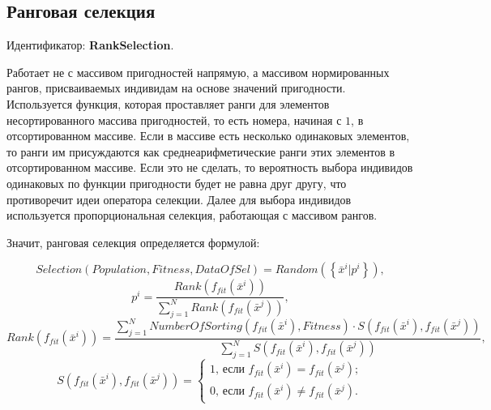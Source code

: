 \subsection{Ранговая селекция}\label{SetOfOperatorsAlgorithms:RankSelection}

Идентификатор: \textbf{RankSelection}.

Работает не  с массивом пригодностей напрямую, а массивом нормированных рангов, присваиваемых индивидам на основе значений пригодности. Используется функция, которая проставляет ранги для элементов несортированного массива пригодностей, то есть номера, начиная с $ 1 $, в отсортированном массиве. Если в массиве есть несколько одинаковых элементов, то ранги им присуждаются как среднеарифметические ранги этих элементов в отсортированном массиве. Если это не сделать, то вероятность выбора индивидов одинаковых по функции пригодности будет не равна друг другу, что противоречит идеи оператора селекции. Далее для выбора индивидов используется пропорциональная селекция, работающая с массивом рангов.

Значит, ранговая селекция определяется формулой:

\begin{equation}
\label{SetOfOperatorsAlgorithms:eq:RankSelection}
Selection\left( Population, Fitness, DataOfSel\right) = Random\left( \left\lbrace\bar{x}^i | p^i \right\rbrace \right),
\end{equation}
\begin{equation}
p^i=\dfrac{Rank\left( f_{fit}\left( \bar{x}^i\right)\right)  }{\sum_{j=1}^N{Rank\left( f_{fit}\left( \bar{x}^j\right)\right)}},
\end{equation}
\begin{equation}\label{SetOfOperatorsAlgorithms:eq:Rank}
Rank\left( f_{fit}\left( \bar{x}^i\right)\right)=\dfrac{\sum_{j=1}^{N}{NumberOfSorting\left( f_{fit}\left( \bar{x}^i\right), Fitness\right)  \cdot S\left(  f_{fit}\left( \bar{x}^i\right),  f_{fit}\left( \bar{x}^j\right)\right) }}{\sum_{j=1}^{N}{S\left(  f_{fit}\left( \bar{x}^i\right),  f_{fit}\left( \bar{x}^j\right)\right) }},
\end{equation}
\begin{equation}
S\left(  f_{fit}\left( \bar{x}^i\right),  f_{fit}\left( \bar{x}^j\right)\right)= \left\lbrace \begin{array}{l}
1 \text{, если } f_{fit}\left( \bar{x}^i\right)=  f_{fit}\left( \bar{x}^j\right);\\ 0\text{, если } f_{fit}\left( \bar{x}^i\right)\neq  f_{fit}\left( \bar{x}^j\right).
\end{array}\right.
\end{equation}

